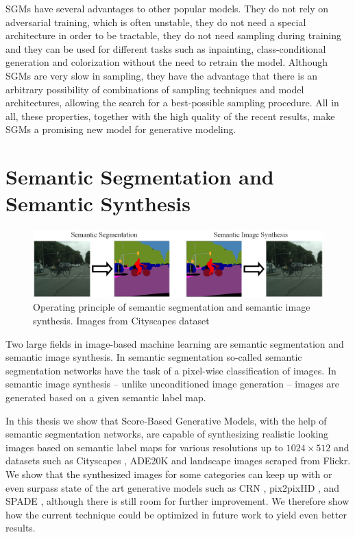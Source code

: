 \thispagestyle{plain}
SGMs have several advantages to other popular models. They do not rely on adversarial training, which is often unstable, they do not need a special architecture in order to be tractable, they do not need sampling during training and they can be used for different tasks such as inpainting, class-conditional generation and colorization without the need to retrain the model. Although SGMs are very slow in sampling, they have the advantage that there is an arbitrary possibility of combinations of sampling techniques and model architectures, allowing the search for a best-possible sampling procedure. All in all, these properties, together with the high quality of the recent results, make SGMs a promising new model for generative modeling.
\section{Semantic Segmentation and Semantic Synthesis} 
\thispagestyle{plain}
%
\begin{figure}[h!]
    \centering
    \includegraphics[width=1\textwidth]{Chapters/figures/sem_seg_vs_sem_synth.PNG}
    \caption[Operating principle of semantic segmentation and semantic image synthesis]{Operating principle of semantic segmentation and semantic image synthesis. Images from Cityscapes dataset \cite{cityscapes}}
\end{figure}
%
Two large fields in image-based machine learning are semantic segmentation and semantic image synthesis. In semantic segmentation so-called semantic segmentation networks have the task of a pixel-wise classification of images. In semantic image synthesis – unlike unconditioned image generation \cite{score_3} – images are generated based on a given semantic label map.

In this thesis we show that Score-Based Generative Models, with the help of semantic segmentation networks, are capable of synthesizing realistic looking images based on semantic label maps for various resolutions up to $1024\times512$ and datasets such as Cityscapes \cite{cityscapes}, ADE20K \cite{ade20k} and landscape images scraped from Flickr. We show that the synthesized images for some categories can keep up with or even surpass state of the art generative models such as CRN \cite{crn}, pix2pixHD \cite{pix2pixHD}, and SPADE \cite{spade}, although there is still room for further improvement. We therefore show how the current technique could be optimized in future work to yield even better results. 

